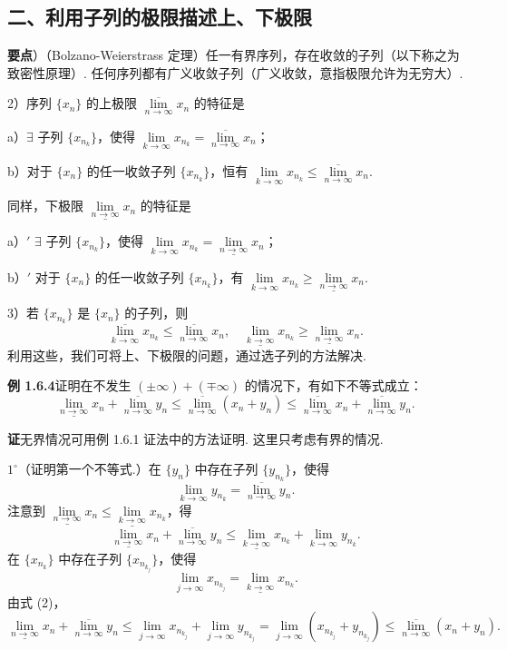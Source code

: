 \documentclass[UTF8,12pt,a4paper,fontset=fandol]{ctexart}
\begin{document}
\subsection*{二、利用子列的极限描述上、下极限}

\noindent\textbf{要点}）（Bolzano-Weierstrass 定理）任一有界序列，存在收敛的子列（以下称之为致密性原理）. 任何序列都有广义收敛子列（广义收敛，意指极限允许为无穷大）.

2）序列 $\{x_n\}$ 的上极限 $\overline{\lim\limits_{n\to\infty}}x_n$ 的特征是

a）$\exists$ 子列 $\{x_{n_k}\}$，使得 $\lim\limits_{k\to\infty}x_{n_k}=\overline{\lim\limits_{n\to\infty}}x_n$；

b）对于 $\{x_n\}$ 的任一收敛子列 $\{x_{n_k}\}$，恒有 $\lim\limits_{k\to\infty}x_{n_k}\le \overline{\lim\limits_{n\to\infty}}x_n$.

同样，下极限 $\underline{\lim\limits_{n\to\infty}}x_n$ 的特征是

a）$'$ $\exists$ 子列 $\{x_{n_k}\}$，使得 $\lim\limits_{k\to\infty}x_{n_k}=\underline{\lim\limits_{n\to\infty}}x_n$；

b）$'$ 对于 $\{x_n\}$ 的任一收敛子列 $\{x_{n_k}\}$，有 $\lim\limits_{k\to\infty}x_{n_k}\ge \underline{\lim\limits_{n\to\infty}}x_n$.

3）若 $\{x_{n_k}\}$ 是 $\{x_n\}$ 的子列，则
\[
  \overline{\lim_{k\to\infty}}x_{n_k}\le \overline{\lim_{n\to\infty}}x_n,\quad
  \underline{\lim_{k\to\infty}}x_{n_k}\ge \underline{\lim_{n\to\infty}}x_n.
\]
利用这些，我们可将上、下极限的问题，通过选子列的方法解决.

\noindent\textbf{例 1.6.4}\quad 证明在不发生 $(\pm\infty)+(\mp\infty)$ 的情况下，有如下不等式成立：
\[
  \underline{\lim_{n\to\infty}}x_n+\overline{\lim_{n\to\infty}}y_n
  \le \overline{\lim_{n\to\infty}}(x_n+y_n)
  \le \overline{\lim_{n\to\infty}}x_n+\overline{\lim_{n\to\infty}}y_n.
\tag{1}
\]

\noindent\textbf{证}\quad 无界情况可用例 1.6.1 证法中的方法证明. 这里只考虑有界的情况.

$1^\circ$（证明第一个不等式.）在 $\{y_n\}$ 中存在子列 $\{y_{n_k}\}$，使得
\[
  \lim_{k\to\infty}y_{n_k}=\overline{\lim_{n\to\infty}}y_n.
\]
注意到 $\underline{\lim\limits_{n\to\infty}}x_n\le \underline{\lim\limits_{k\to\infty}}x_{n_k}$，得
\[
  \underline{\lim_{n\to\infty}}x_n+\overline{\lim_{n\to\infty}}y_n
  \le \underline{\lim_{k\to\infty}}x_{n_k}+\lim_{k\to\infty}y_{n_k}.
\tag{2}
\]
在 $\{x_{n_k}\}$ 中存在子列 $\{x_{n_{k_j}}\}$，使得
\[
  \lim_{j\to\infty}x_{n_{k_j}}=\underline{\lim_{k\to\infty}}x_{n_k}.
\]
由式 (2)，
\[
  \underline{\lim_{n\to\infty}}x_n+\overline{\lim_{n\to\infty}}y_n
  \le \lim_{j\to\infty}x_{n_{k_j}}+\lim_{j\to\infty}y_{n_{k_j}}
  =\lim_{j\to\infty}(x_{n_{k_j}}+y_{n_{k_j}})
  \le \overline{\lim_{n\to\infty}}(x_n+y_n).
\]
\end{document}
